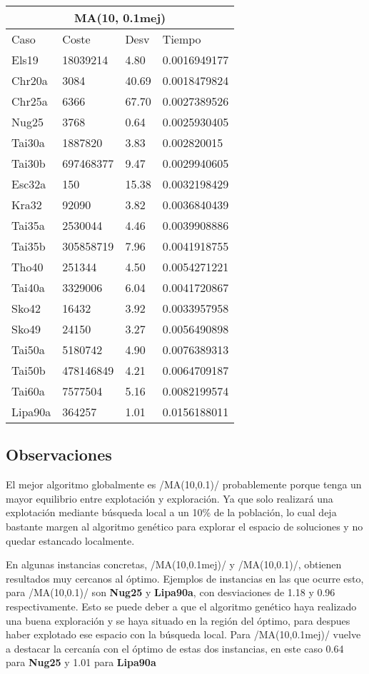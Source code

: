 \documentclass[twoside]{article}
\begin{document}
\begin{table}[h]
\centering
    \begin{tabular}{llll}
    \hline
    \multicolumn{4}{c}{MA(10, 0.1mej)} \\
    \toprule
    Caso               & Coste & Desv & Tiempo \\
    \midrule
Els19&18039214&4.80&0.0016949177\\
Chr20a&3084&40.69&0.0018479824\\
Chr25a&6366&67.70&0.0027389526\\
Nug25&3768&0.64&0.0025930405\\
Tai30a&1887820&3.83&0.002820015\\
Tai30b&697468377&9.47&0.0029940605\\
Esc32a&150&15.38&0.0032198429\\
Kra32&92090&3.82&0.0036840439\\
Tai35a&2530044&4.46&0.0039908886\\
Tai35b&305858719&7.96&0.0041918755\\
Tho40&251344&4.50&0.0054271221\\
Tai40a&3329006&6.04&0.0041720867\\
Sko42&16432&3.92&0.0033957958\\
Sko49&24150&3.27&0.0056490898\\
Tai50a&5180742&4.90&0.0076389313\\
Tai50b&478146849&4.21&0.0064709187\\
Tai60a&7577504&5.16&0.0082199574\\
Lipa90a&364257&1.01&0.0156188011\\
    \bottomrule
    \end{tabular}
    \caption{}
\end{table}

\subsection{Observaciones}

El mejor algoritmo globalmente es \pythoninline/MA(10,0.1)/ probablemente
porque tenga un mayor equilibrio entre explotación y exploración. Ya que
solo realizará una explotación mediante búsqueda local a un 10\% de la población,
lo cual deja bastante margen al algoritmo genético para explorar el espacio
de soluciones y no quedar estancado localmente.

En algunas instancias concretas, \pythoninline/MA(10,0.1mej)/ y \pythoninline/MA(10,0.1)/,
obtienen resultados muy cercanos al óptimo. Ejemplos de instancias en las
que ocurre esto, para \pythoninline/MA(10,0.1)/ son \textbf{Nug25} y \textbf{Lipa90a},
con desviaciones de 1.18 y 0.96 respectivamente. Esto se puede deber
a que el algoritmo genético haya realizado una buena exploración y se haya
situado en la región del óptimo, para despues haber explotado ese espacio
con la búsqueda local. Para \pythoninline/MA(10,0.1mej)/ vuelve a destacar
la cercanía con el óptimo de estas dos instancias, en este caso 0.64 para
\textbf{Nug25} y 1.01 para \textbf{Lipa90a}
\end{document}
